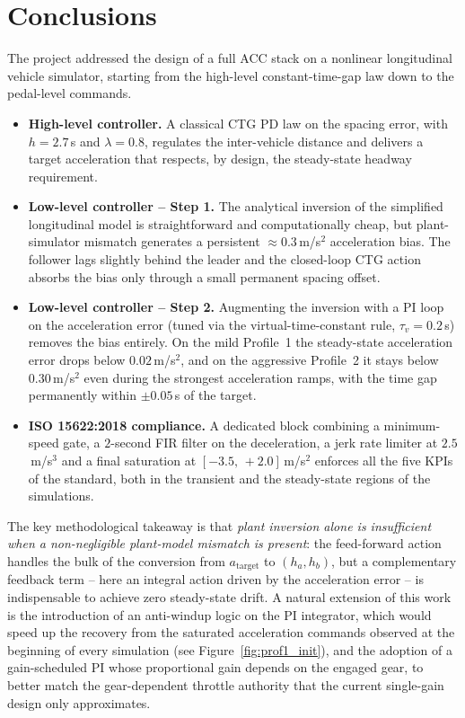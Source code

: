\section{Conclusions}
The project addressed the design of a full ACC stack on a nonlinear
longitudinal vehicle simulator, starting from the high-level
constant-time-gap law down to the pedal-level commands.
\begin{itemize}
    \item \textbf{High-level controller.} A classical CTG PD law on
          the spacing error, with $h = 2.7$\,s and $\lambda = 0.8$,
          regulates the inter-vehicle distance and delivers a target
          acceleration that respects, by design, the steady-state
          headway requirement.
    \item \textbf{Low-level controller -- Step 1.} The analytical
          inversion of the simplified longitudinal model is
          straightforward and computationally cheap, but
          plant-simulator mismatch generates a persistent $\approx
          0.3$\,m/s$^2$ acceleration bias. The follower lags slightly
          behind the leader and the closed-loop CTG action absorbs the
          bias only through a small permanent spacing offset.
    \item \textbf{Low-level controller -- Step 2.} Augmenting the
          inversion with a PI loop on the acceleration error (tuned
          via the virtual-time-constant rule, $\tau_v = 0.2$\,s)
          removes the bias entirely. On the mild Profile~1 the
          steady-state acceleration error drops below
          $0.02$\,m/s$^2$, and on the aggressive Profile~2 it stays
          below $0.30$\,m/s$^2$ even during the strongest
          acceleration ramps, with the time gap permanently within
          $\pm 0.05$\,s of the target.
    \item \textbf{ISO 15622:2018 compliance.} A dedicated block
          combining a minimum-speed gate, a $2$-second FIR filter on
          the deceleration, a jerk rate limiter at
          $2.5$\,m/s$^3$ and a final saturation at
          $[-3.5,\,+2.0]$\,m/s$^2$ enforces all the five KPIs of the
          standard, both in the transient and the steady-state
          regions of the simulations.
\end{itemize}

The key methodological takeaway is that \emph{plant inversion alone
is insufficient when a non-negligible plant-model mismatch is present}:
the feed-forward action handles the bulk of the conversion from
$a_\text{target}$ to $(h_a,h_b)$, but a complementary feedback term --
here an integral action driven by the acceleration error -- is
indispensable to achieve zero steady-state drift. A natural extension
of this work is the introduction of an anti-windup logic on the PI
integrator, which would speed up the recovery from the saturated
acceleration commands observed at the beginning of every simulation
(see Figure~\ref{fig:prof1_init}), and the adoption of a gain-scheduled
PI whose proportional gain depends on the engaged gear, to better
match the gear-dependent throttle authority that the current
single-gain design only approximates.
